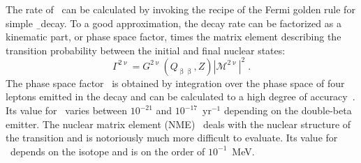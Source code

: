 The rate of \nnbb\ can be calculated by invoking the recipe of the Fermi golden rule for
simple \b\ decay. To a good approximation, the decay rate can be factorized as a kinematic
part, or phase space factor, times the matrix element describing the transition
probability between the initial and final nuclear states:
\[
  \Gamma^{2\upnu} = G^{2\upnu}(Q_{\upbeta\upbeta},Z) |\mathcal{M}^{2\upnu}|^2 \;.
\]
The phase space factor \psft\ is obtained by integration over the phase space of four
leptons emitted in the decay and can be calculated to a high degree of
accuracy~\cite{Kotila2012, Stoica2013}. Its value for \nnbb\ varies between $10^{-21}$ and
$10^{-17}$~yr$^{-1}$ depending on the double-beta emitter.  The nuclear matrix element
(NME) \nmet\ deals with the nuclear structure of the transition and is notoriously much
more difficult to evaluate. Its value for \nnbb\ depends on the isotope and is on the
order of $10^{-1}$~MeV.

